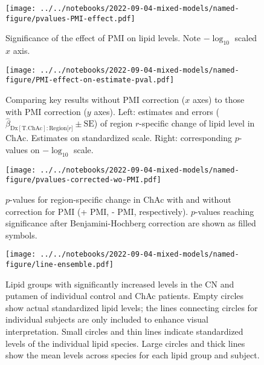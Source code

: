 \documentclass[letterpaper]{article}
\begin{document}
\begin{figure}[p]
\begin{center}
	\texttt{[image: ../../notebooks/2022-09-04-mixed-models/named-figure/pvalues-PMI-effect.pdf]}
\end{center}
	\caption[Significance of the effect of PMI on lipid levels]{
		Significance of the effect of PMI on lipid levels.  Note $-\log_{10}$ scaled $x$
		axis.
}
\label{fig:PMI-pvals}
\end{figure}

\begin{figure}[p]
\begin{center}
	\texttt{[image: ../../notebooks/2022-09-04-mixed-models/named-figure/PMI-effect-on-estimate-pval.pdf]}
\end{center}
	\caption[Comparing key results without PMI correction to those with PMI correction]{
		Comparing key results without PMI correction ($x$ axes) to those with PMI
		correction ($y$ axes).  Left: estimates and errors
		($\hat{\beta}_{\mathrm{Dx[T.ChAc]}:\mathrm{Region[}r\mathrm{]}} \pm
		\mathrm{SE}$) of region $r$-specific change of lipid level in ChAc.
		Estimates on standardized scale.
		Right: corresponding $p$-values on $-\log_{10}$ scale.
}
\label{fig:PMI-effect-on-estimates}
\end{figure}

\begin{figure}[p]
\begin{center}
	\texttt{[image: ../../notebooks/2022-09-04-mixed-models/named-figure/pvalues-corrected-wo-PMI.pdf]}
\end{center}
	\caption[$p$-values for region-specific change in ChAc with and without correction for PMI]{
		$p$-values for region-specific change in ChAc with and without correction
		for PMI (+ PMI, - PMI, respectively).  $p$-values reaching significance
		after Benjamini-Hochberg correction are shown as filled symbols.
}
\label{fig:pvalues-corrected-wo-PMI}
\end{figure}


\begin{figure}[p]
\begin{center}
	\texttt{[image: ../../notebooks/2022-09-04-mixed-models/named-figure/line-ensemble.pdf]}
\end{center}
	\caption[Significant lipid changes in individual control and ChAc patients I.]{
		Lipid groups with significantly increased levels in the CN and putamen of
		individual control and ChAc patients. Empty circles show actual
		standardized lipid
		levels; the lines connecting circles for individual subjects are only
		included to enhance visual interpretation. Small circles and thin lines
		indicate standardized levels of the individual lipid species. Large circles
		and thick lines show the mean levels across species for each lipid group and
		subject.
}
\label{fig:individual-changes}
\end{figure}
\end{document}
